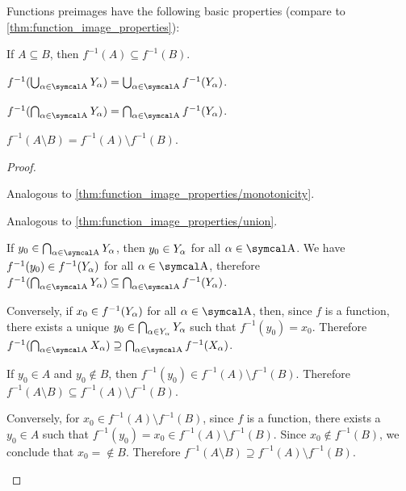 \begin{proposition}\label{thm:function_preimage_properties}
  Functions preimages have the following basic properties (compare to \cref{thm:function_image_properties}):
  \begin{propenum}
     If \( A \subseteq B \), then \( f^{-1}(A) \subseteq f^{-1}(B) \).

     \( f^{-1}(\bigcup_{\al \in \CA} Y_\al) = \bigcup_{\al \in \CA} f^{-1}(Y_\al) \).

     \( f^{-1}(\bigcap_{\al \in \CA} Y_\al) = \bigcap_{\al \in \CA} f^{-1}(Y_\al) \).

     \( f^{-1}(A \setminus B) = f^{-1}(A) \setminus f^{-1}(B) \).
  \end{propenum}
\end{proposition}
\begin{proof}\mbox{}
  \begin{propenum}
     Analogous to \cref{thm:function_image_properties/monotonicity}.

     Analogous to \cref{thm:function_image_properties/union}.

     If \( y_0 \in \bigcap_{\al \in \CA} Y_{\al} \), then \( y_0 \in Y_\alpha \) for all \( \al \in \CA \). We have \( f^{-1}(y_0) \in f^{-1}(Y_\alpha) \) for all \( \al \in \CA \), therefore \( f^{-1}(\bigcap_{\al \in \CA} Y_\al) \subseteq \bigcap_{\al \in \CA} f^{-1}(Y_\al) \).

    Conversely, if \( x_0 \in f^{-1}(Y_\alpha) \) for all \( \al \in \CA \), then, since \( f \) is a function, there exists a unique \( y_0 \in \bigcap_{\alpha \in Y_\alpha}Y_\alpha \) such that \( f^{-1}(y_0) = x_0 \). Therefore \( f^{-1}(\bigcap_{\al \in \CA} X_\al) \supseteq \bigcap_{\al \in \CA} f^{-1}(X_\al) \).

     If \( y_0 \in A \) and \( y_0 \not\in B \), then \( f^{-1}(y_0) \in f^{-1}(A) \setminus f^{-1}(B) \). Therefore \( f^{-1}(A \setminus B) \subseteq f^{-1}(A) \setminus f^{-1}(B) \).

    Conversely, for \( x_0 \in f^{-1}(A) \setminus f^{-1}(B) \), since \( f \) is a function, there exists a \( y_0 \in A \) such that \( f^{-1}(y_0) = x_0 \in f^{-1}(A) \setminus f^{-1}(B) \). Since \( x_0 \not\in f^{-1}(B) \), we conclude that \( x_0 = \not\in B \). Therefore \( f^{-1}(A \setminus B) \supseteq f^{-1}(A) \setminus f^{-1}(B) \).
  \end{propenum}
\end{proof}

